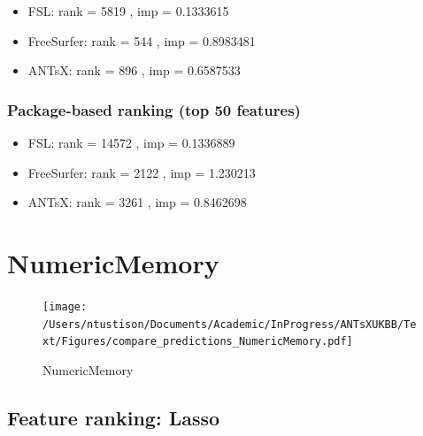 \documentclass[
  10pt,
]{article}
\begin{document}
\begin{itemize}
\item
  FSL: rank = 5819 , imp = 0.1333615
\item
  FreeSurfer: rank = 544 , imp = 0.8983481
\item
  ANTsX: rank = 896 , imp = 0.6587533
\end{itemize}

\hypertarget{package-based-ranking-top-50-features-2}{%
\subsubsection{Package-based ranking (top 50
features)}\label{package-based-ranking-top-50-features-2}}

\begin{itemize}
\item
  FSL: rank = 14572 , imp = 0.1336889
\item
  FreeSurfer: rank = 2122 , imp = 1.230213
\item
  ANTsX: rank = 3261 , imp = 0.8462698
\end{itemize}

\clearpage

\hypertarget{numericmemory}{%
\section{NumericMemory}\label{numericmemory}}

\begin{figure}
\centering
\texttt{[image: /Users/ntustison/Documents/Academic/InProgress/ANTsXUKBB/Text/Figures/compare\_predictions\_NumericMemory.pdf]}
\caption{NumericMemory}
\end{figure}

\hypertarget{feature-ranking-lasso-1}{%
\subsection{Feature ranking: Lasso}\label{feature-ranking-lasso-1}}
\end{document}
